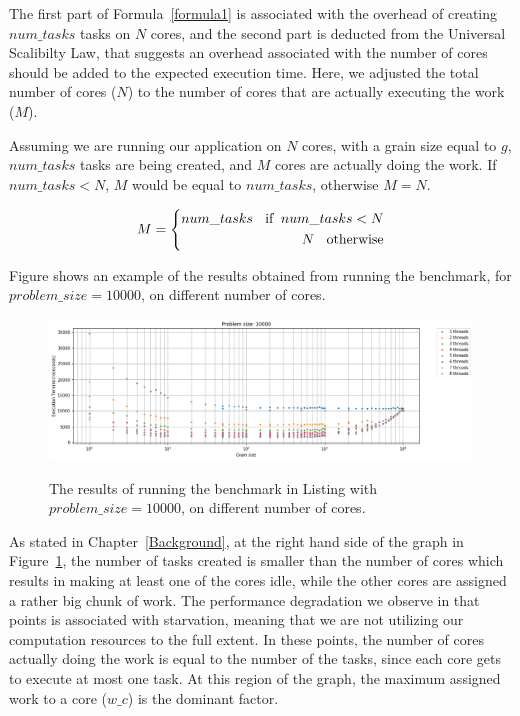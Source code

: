 The first part of Formula~\ref{formula1} is associated with the overhead of creating $num\_{tasks}$ tasks on $N$ cores, and the second part is deducted from the Universal Scalibilty Law\cite{gunther2007guerrilla}, that suggests an overhead associated with the number of cores should be added to the expected execution time. Here, we adjusted the total number of cores ($N$) to the number of cores that are actually executing the work ($M$). 

Assuming we are running our application on $N$ cores, with a grain size equal to $g$, $num\_{tasks}$ tasks are being created, and $M$ cores are actually doing the work. If $num\_{tasks}<N$, $M$ would be equal to $num\_{tasks}$, otherwise $M=N$.

\begin{equation}\label{formula19}
M=\left\{
\begin{aligned}
num\_{tasks} \text{\:\:\:\:if \:} num\_{tasks}<N\\
N \text{\:\:\:\:otherwise}
\end{aligned}
\right.
\end{equation}

Figure shows an example of the results obtained from running the benchmark, for $problem\_size=10000$, on different number of cores.

\vspace{\baselineskip}	
\begin{figure}[H]
	\centering
	{\includegraphics[scale=.45]{images/hpx_for_loop/10000_8_all.png}}
	\caption{The results of running the benchmark in Listing with $problem\_size=10000$, on different number of cores.}\label{fig39}		
\end{figure}

As stated in Chapter~\ref{Background}, at the right hand side of the graph in Figure~\ref{fig39}, the number of tasks created is smaller than the number of cores which results in making at least one of the cores idle, while the other cores are assigned a rather big chunk of work. The performance degradation we observe in that points is associated with starvation, meaning that we are not utilizing our computation resources to the full extent. In these points, the number of cores actually doing the work is equal to the number of the tasks, since each core gets to execute at most one task. At this region of the graph, the maximum assigned work to a core ($w\_c$) is the dominant factor.   

